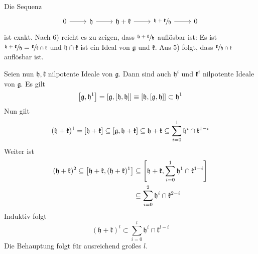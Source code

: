 \begin{beweis}
\begin{enumerate}[1)]
		Die Sequenz
		\[
			\begin{tikzcd}
				0 \rar & \mathfrak{h} \rar & \mathfrak{h} + \mathfrak{k} \rar & \sfrac{\mathfrak{h} + \mathfrak{k}}{\mathfrak{h}} \rar & 0
			\end{tikzcd}
		\]
		ist exakt.
		Nach 6) reicht es zu zeigen, dass $\sfrac{\mathfrak{h} + \mathfrak{k}}{\mathfrak{h}}$ auflösbar ist: 
		Es ist $\sfrac{\mathfrak{h}+ \mathfrak{k}}{\mathfrak{h}} = \sfrac{\mathfrak{k}}{\mathfrak{k} \cap \mathfrak{k}}$ und $\mathfrak{h} \cap \mathfrak{k}$ ist ein Ideal von $\mathfrak{g}$ und $\mathfrak{k}$.
		Aus 5) folgt, dass $\sfrac{\mathfrak{k}}{\mathfrak{h} \cap \mathfrak{k}}$ auflösbar ist.
		
		Seien nun $\mathfrak{h}, \mathfrak{k}$ nilpotente Ideale von $\mathfrak{g}$.
		Dann sind auch $\mathfrak{h}^i$ und $\mathfrak{k}^i$ nilpotente Ideale von $\mathfrak{g}$.
		Es gilt
		\[
			\benbrace*{\mathfrak{g}, \mathfrak{h}^1} = \benbrace*{\mathfrak{g}, \benbrace*{\mathfrak{h}, \mathfrak{h}}} \equiv \benbrace*{\mathfrak{h}, \benbrace*{\mathfrak{g},\mathfrak{h}}} \subset \mathfrak{h}^1
		\]
		Nun gilt 
		\[
			(\mathfrak{h} + \mathfrak{k})^1 = \benbrace*{\mathfrak{h} + \mathfrak{k}} \subseteq \benbrace*{\mathfrak{g},\mathfrak{h} + \mathfrak{k}} \subseteq \mathfrak{h} + \mathfrak{k} \subseteq \sum_{i=0}^{1} \mathfrak{h}^i \cap \mathfrak{k}^{1-i}
		\]
		Weiter ist 
		\begin{align}
			(\mathfrak{h} + \mathfrak{k})^2 \subseteq \benbrace*{\mathfrak{h} + \mathfrak{k},(\mathfrak{h} + \mathfrak{k})^1} &\subseteq \benbrace*{\mathfrak{h} + \mathfrak{k}, \sum_{i=0}^{1} \mathfrak{h}^1 \cap \mathfrak{k}^{1-i} } \\
			&\subseteq \sum_{i=0}^{2} \mathfrak{h}^i \cap \mathfrak{k}^{2-i}
		\end{align}
		Induktiv folgt
		\[
			(\mathfrak{h} + \mathfrak{k})^l \subset \sum_{i=0}^{l} \mathfrak{h}^i \cap \mathfrak{k}^{l-i}
		\]
		Die Behauptung folgt für ausreichend großes $l$.
	\end{enumerate}
\end{beweis}

